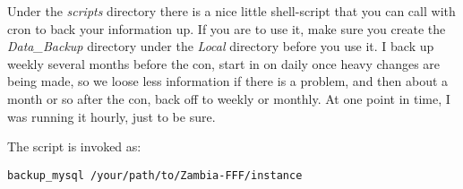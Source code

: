 \documentclass[tablesignature]{scrartcl}
\begin{document}
  Under the \emph{scripts} directory there is a nice little shell-script
  that you can call with cron to back your information up.  If you are
  to use it, make sure you create the \emph{Data\_{}Backup} directory under
  the \emph{Local} directory before you use it.  I back up weekly several
  months before the con, start in on daily once heavy changes are
  being made, so we loose less information if there is a problem, and
  then about a month or so after the con, back off to weekly or
  monthly.  At one point in time, I was running it hourly, just to be
  sure.

  The script is invoked as:
\begin{verbatim}
backup_mysql /your/path/to/Zambia-FFF/instance
\end{verbatim}
\end{document}
